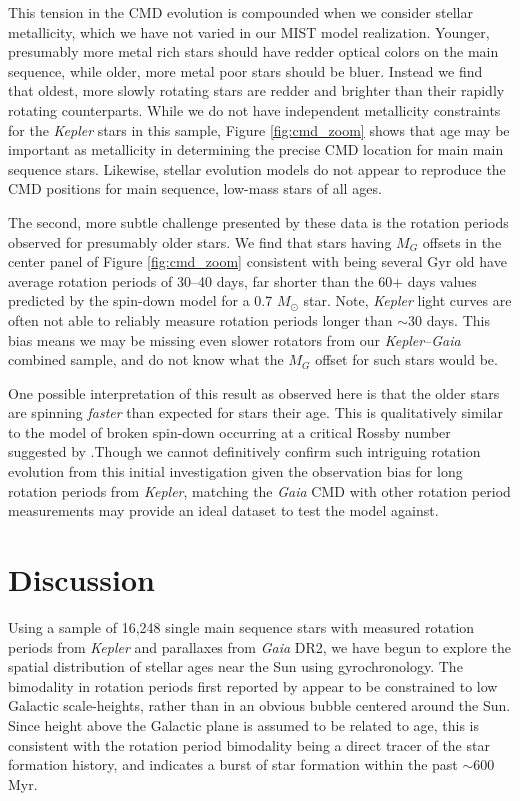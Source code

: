 \documentclass[trackchanges,preprint2]{aastex62}
\newcommand{\Kepler}{\textsl{Kepler}\xspace}
\begin{document}
This tension in the CMD evolution is compounded when we consider stellar metallicity, which we have not varied in our MIST model realization. Younger, presumably more metal rich stars should have redder optical colors on the main sequence, while older, more metal poor stars should be bluer. Instead we find that oldest, more slowly rotating stars are redder and brighter than their rapidly rotating counterparts. While we do not have independent metallicity constraints for the \Kepler stars in this sample, Figure \ref{fig:cmd_zoom} shows that age may be  important as metallicity in determining the precise CMD location for main main sequence stars. Likewise, stellar evolution models do not appear to reproduce the CMD positions for main sequence, low-mass stars of all ages.


The second, more subtle challenge presented by these data is the rotation periods observed for presumably older stars. 
We find that stars having $M_G$ offsets in the center panel of Figure \ref{fig:cmd_zoom} consistent with being several Gyr old have average rotation periods of 30--40 days, far shorter than the 60+ days values predicted by the spin-down model for a 0.7 $M_\odot$ star.  Note, \Kepler light curves are often not able to reliably measure rotation periods longer than $\sim$30 days. This bias means we may be missing even slower rotators from our \Kepler--{\em Gaia} combined sample, and do not know what the $M_G$ offset for such stars would be. 


One possible interpretation of this result as observed here is that the older stars are spinning {\it faster} than expected for stars their age. This is qualitatively similar to the model of broken spin-down occurring at a critical Rossby number suggested by \citet{van-saders2016}.Though we cannot definitively confirm such intriguing rotation evolution from this initial investigation given the observation bias for long rotation periods from \Kepler, matching the {\em Gaia} CMD with other rotation period measurements may provide an ideal dataset to test the \citet{van-saders2016} model against. 





\section{Discussion}
\label{sec:discussion}

Using a sample of 16,248 single main sequence stars with measured rotation periods from \Kepler and parallaxes from {\em Gaia} DR2, we have begun to explore the spatial distribution of stellar ages near the Sun using gyrochronology. The bimodality in rotation periods first reported by \citet{mcquillan2013} appear to be constrained to low Galactic scale-heights, rather than in an obvious bubble centered around the Sun. Since height above the Galactic plane is assumed to be related to age, this is consistent with the rotation period bimodality being a direct tracer of the star formation history, and indicates a burst of star formation within the past $\sim$600 Myr. 
\end{document}
